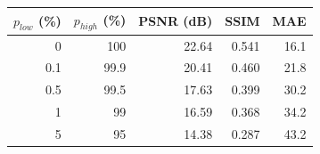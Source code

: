 \small\begin{tabular}{rrrrr}\toprule $p_{low}$ (\%) & $p_{high}$ (\%) & PSNR (dB) & SSIM & MAE \\ \midrule
0 & 100 & 22.64 & 0.541 & 16.1 \\
0.1 & 99.9 & 20.41 & 0.460 & 21.8 \\
0.5 & 99.5 & 17.63 & 0.399 & 30.2 \\
1 & 99 & 16.59 & 0.368 & 34.2 \\
5 & 95 & 14.38 & 0.287 & 43.2 \\
\bottomrule\end{tabular}